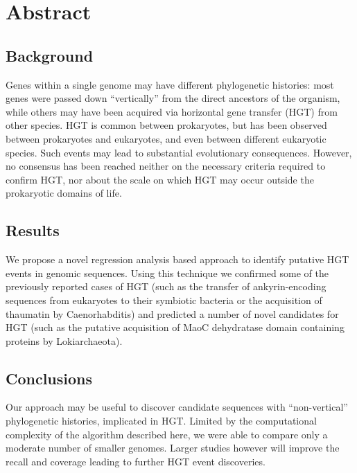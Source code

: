 \section{Abstract}
\subsection{Background}
Genes within a single genome may have different phylogenetic histories: most
genes were passed down ``vertically'' from the direct ancestors of the
organism, while others may have been acquired via horizontal gene transfer
(HGT) from other species. HGT is common between prokaryotes, but has been
observed between prokaryotes and eukaryotes, and even between different
eukaryotic species. Such events may lead to substantial evolutionary
consequences. However, no consensus has been reached neither on the necessary
criteria required to confirm HGT, nor about the scale on which HGT may occur
outside the prokaryotic domains of life.
\subsection{Results}
We propose a novel regression analysis based approach to identify putative HGT
events in genomic sequences. Using this technique we confirmed some of the
previously reported cases of HGT (such as the transfer of ankyrin-encoding
sequences from eukaryotes to their symbiotic bacteria or the acquisition of
thaumatin by Caenorhabditis) and predicted a number of novel candidates for HGT
(such as the putative acquisition of MaoC dehydratase domain containing
proteins by Lokiarchaeota).
\subsection{Conclusions}
Our approach may be useful to discover candidate sequences with
``non-vertical'' phylogenetic histories, implicated in HGT.
Limited by the computational complexity of the algorithm described here, we
were able to compare only a moderate number of smaller genomes. Larger studies
however will improve the recall and coverage leading to further HGT event
discoveries.

